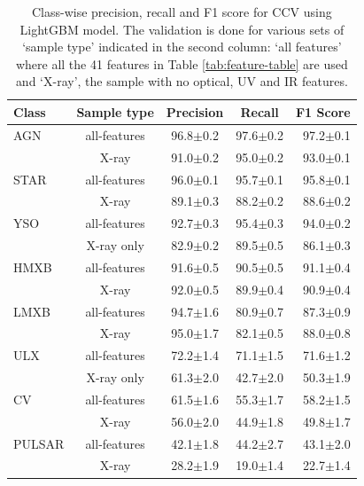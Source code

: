 \documentclass[fleqn,usenatbib]{mnras}
\begin{document}
    \begin{table}
        \centering
        \caption{Class-wise precision, recall and F1 score for CCV using LightGBM model. The validation is done for various sets of `sample type' indicated in the second column: `all features' where all the 41 features in Table \ref{tab:feature-table} are used and `X-ray', the sample with no optical, UV and IR features.}
        \label{tab:feat-imp-score}
        \begin{tabular}{lcccr}
        \toprule
            \textbf{Class} & \textbf{Sample type}   & \textbf{Precision} & \textbf{Recall} & \textbf{F1 Score} \\
        \midrule
        AGN     & all-features &  96.8$\pm$0.2 &  97.6$\pm$0.2 &  97.2$\pm$0.1 \\
                & X-ray &  91.0$\pm$0.2 &  95.0$\pm$0.2 &  93.0$\pm$0.1 \\
        STAR    & all-features &  96.0$\pm$0.1 &  95.7$\pm$0.1 &  95.8$\pm$0.1 \\
                & X-ray &  89.1$\pm$0.3 &  88.2$\pm$0.2 &  88.6$\pm$0.2 \\
        YSO     & all-features &  92.7$\pm$0.3 &  95.4$\pm$0.3 &  94.0$\pm$0.2 \\
                & X-ray only &  82.9$\pm$0.2 &  89.5$\pm$0.5 &  86.1$\pm$0.3 \\
        HMXB    & all-features &  91.6$\pm$0.5 &  90.5$\pm$0.5 &  91.1$\pm$0.4 \\
                & X-ray &  92.0$\pm$0.5 &  89.9$\pm$0.4 &  90.9$\pm$0.4 \\
        LMXB    & all-features &  94.7$\pm$1.6 &  80.9$\pm$0.7 &  87.3$\pm$0.9 \\
                & X-ray &  95.0$\pm$1.7 &  82.1$\pm$0.5 &  88.0$\pm$0.8 \\
        ULX     & all-features &  72.2$\pm$1.4 &  71.1$\pm$1.5 &  71.6$\pm$1.2 \\
                & X-ray only &  61.3$\pm$2.0 &  42.7$\pm$2.0 &  50.3$\pm$1.9 \\
        CV      & all-features &  61.5$\pm$1.6 &  55.3$\pm$1.7 &  58.2$\pm$1.5 \\
                & X-ray &  56.0$\pm$2.0 &  44.9$\pm$1.8 &  49.8$\pm$1.7 \\
        PULSAR  & all-features &  42.1$\pm$1.8 &  44.2$\pm$2.7 &  43.1$\pm$2.0 \\
                & X-ray &  28.2$\pm$1.9 &  19.0$\pm$1.4 &  22.7$\pm$1.4 \\
        \bottomrule
        \end{tabular}
    \end{table}
\end{document}
